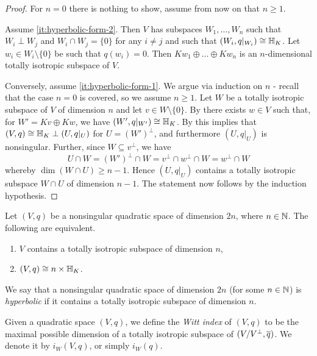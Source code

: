 \documentclass[12pt, leqno, british]{amsart}
\begin{document}
\begin{proof}
For $n = 0$ there is nothing to show, assume from now on that $n \geq 1$.

Assume \eqref{it:hyperbolic-form-2}. 
Then $V$ has subspaces $W_1, \ldots, W_n$ such that $W_i \perp W_j$ and $W_i \cap W_j = \lbrace 0 \rbrace$ for any $i \neq j$ and such that $(W_i, q\vert_{W_i}) \cong \mathbb{H}_K$.
Let $w_i \in W_i \setminus \lbrace 0 \rbrace$ be such that $q(w_i) = 0$.
Then $Kw_1 \oplus \ldots \oplus Kw_n$ is an $n$-dimensional totally isotropic subspace of $V$.

Conversely, assume \eqref{it:hyperbolic-form-1}.
We argue via induction on $n$ - recall that the case $n = 0$ is covered, so we assume $n \geq 1$.
Let $W$ be a totally isotropic subspace of $V$ of dimension $n$ and let $v \in W \setminus \lbrace 0 \rbrace$.
By  there exists $w \in V$ such that, for $W' = Kv \oplus Kw$, we have $(W', q\vert_{W'}) \cong \mathbb{H}_K$.
By  this implies that $(V, q) \cong \mathbb{H}_K \perp (U, q\vert_U)$ for $U=(W')^\perp$, and furthermore $(U, q\vert_U)$ is nonsingular.
Further, since $W \subseteq v^\perp$, we have
$$ U \cap W = (W')^\perp \cap W = v^\perp \cap w^\perp \cap W = w^\perp \cap W $$
whereby $\dim(W \cap U) \geq n-1$.
Hence $(U, q\vert_U)$ contains a totally isotropic subspace $W \cap U$ of dimension $n-1$.
The statement now follows by the induction hypothesis.
\end{proof}
\begin{cor}\label{C:hyperbolic-form}
Let $(V, q)$ be a nonsingular quadratic space of dimension $2n$, where $n \in \mathbb N$.
The following are equivalent.
\begin{enumerate}
\item $V$ contains a totally isotropic subspace of dimension $n$,
\item $(V, q) \cong n \times \mathbb{H}_K$.
\end{enumerate}
\end{cor}
\begin{defi}
We say that a nonsingular quadratic space of dimension $2n$ (for some $n \in \mathbb N$) is \emph{hyperbolic} if it contains a totally isotropic subspace of dimension $n$.

Given a quadratic space $(V, q)$, we define the \emph{Witt index} of $(V, q)$ to be the maximal possible dimension of a totally isotropic subspace of $(V/V^\perp, \overline{q})$.
We denote it by $i_W(V, q)$, or simply $i_W(q)$.
\end{defi}
\end{document}
